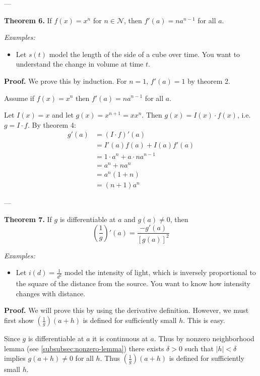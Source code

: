 ---\vs

\textbf{Theorem 6.} If $f(x)=x^n$ for $n\in\mathcal{N}$, then $f'(a)=na^{n-1}$ for
all $a$.

\vs

\textit{Examples:}
\begin{itemize}
\item Let $s(t)$ model the length of the side of a cube over time. You
  want to understand the change in volume at time $t$.
\end{itemize}

\textbf{Proof.} We prove this by induction. For $n=1$, $f'(a)=1$ by
theorem 2.

\vs

Assume if $f(x)=x^n$ then $f'(a)=na^{n-1}$ for all $a$.

\vs

Let $I(x)=x$ and let $g(x)=x^{n+1}=xx^n$. Then $g(x)=I(x)\cdot f(x)$, i.e.
$g=I\cdot f$. By theorem 4:
\begin{align*}
  g'(a)&=(I\cdot f)'(a)\\
       &=I'(a)f(a)+I(a)f'(a)\\
       &=1\cdot a^n+a\cdot na^{n-1}\\
       &=a^n+na^n\\
       &=a^n(1+n)\\
       &=(n+1)a^n
\end{align*}

---\vs

\textbf{Theorem 7.} If $g$ is differentiable at $a$ and $g(a)\neq0$, then
\[\left(\frac{1}{g}\right)'(a)=\frac{-g'(a)}{{[g(a)]}^2}\]

\textit{Examples:}
\begin{itemize}
\item Let $i(d)=\frac{1}{d^2}$ model the intensity of light, which
  is inversely proportional to the square of the distance from the
  source. You want to know how intensity changes with distance.
\end{itemize}

\textbf{Proof.} We will prove this by using the derivative definition.
However, we must first show $\left(\frac{1}{g}\right)(a+h)$ is defined
for sufficiently small $h$. This is easy.

\vs

Since $g$ is differentiable at $a$ it is continuous at $a$. Thus by
nonzero neighborhood lemma (see \ref{subsubsec:nonzero-lemma}) there
exists $\delta>0$ such that $|h|<\delta$ implies $g(a+h)\neq0$ for all
$h$. Thus $\left(\frac{1}{g}\right)(a+h)$ is defined for sufficiently
small $h$.

